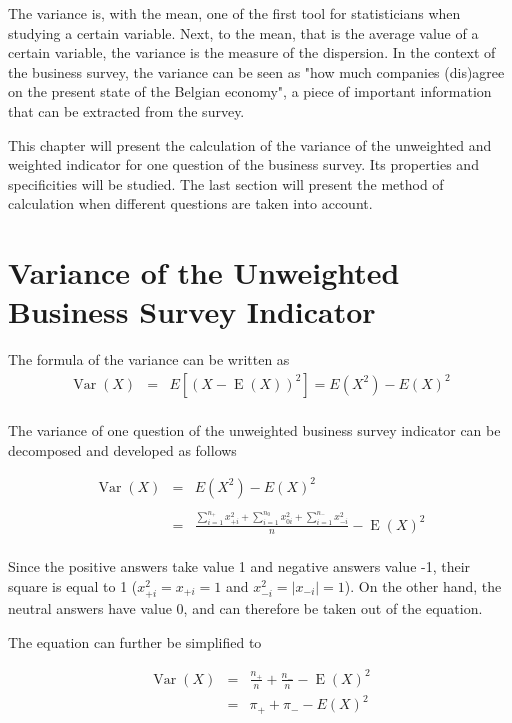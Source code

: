 \documentclass[12pt,a4paper,oneside]{book}
\DeclareMathOperator{\Var}{Var}
\DeclareMathOperator{\E}{E}
\begin{document}
The variance is, with the mean, one of the first tool for statisticians when studying a certain variable. 
Next, to the mean, that is the average value of a certain variable, the variance is the measure of the dispersion. 
In the context of the business survey, the variance can be seen as "how much companies (dis)agree on the present state of the Belgian economy", a piece of important information that can be extracted from the survey.

This chapter will present the calculation of the variance of the unweighted and weighted indicator for one question of the business survey. 
Its properties and specificities will be studied.
The last section will present the method of calculation when different questions are taken into account.

\section{Variance of the Unweighted Business Survey Indicator}

\nocite{alcaniz_calculation_2006}

The formula of the variance can be written as 
\begin{eqnarray}
         \Var(X) &=& E \left[ \left(X-\E(X) \right)^2 \right] =  E\left( X^2\right) - E\left( X\right)^2 \\ \nonumber
\end{eqnarray}

The variance of one question of the unweighted business survey indicator can be decomposed and developed as follows

\begin{eqnarray}
\Var(X) &=&  E\left( X^2\right) - E\left( X\right)^2 \nonumber \\ \nonumber \\
    &=&  \frac{\sum_{i=1}^{n_+} x_{+i}^2  +  \sum_{i=1}^{n_0} x_{0i}^2 + \sum_{i=1}^{n_-} x_{-i}^2}{n}  - \E(X)^2 \\ \nonumber
\end{eqnarray}


Since the positive answers take value 1 and negative answers value -1, their square is equal to 1 ($x_{+i}^2 = x_{+i} = 1$ and $x_{-i}^2 = |x_{-i}| = 1$). 
On the other hand, the neutral answers have value 0, and can therefore be taken out of the equation.

The equation can further be simplified to

\begin{eqnarray}
    \Var(X) &=&  \frac{n_+}{n}  +  \frac{n_-}{n}  - \E(X)^2 \\
    &=& \pi_+ + \pi_- - E ( X )^2 \label{var1} \\ \nonumber
\end{eqnarray}
\end{document}
